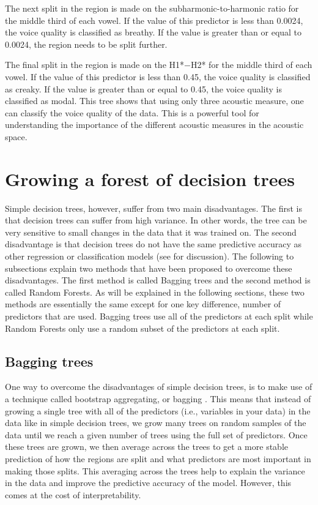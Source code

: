 The next split in the region is made on the subharmonic-to-harmonic ratio for the middle third of each vowel. If the value of this predictor is less than 0.0024, the voice quality is classified as breathy. If the value is greater than or equal to 0.0024, the region needs to be split further.

The final split in the region is made on the H1*$-$H2* for the middle third of each vowel. If the value of this predictor is less than 0.45, the voice quality is classified as creaky. If the value is greater than or equal to 0.45, the voice quality is classified as modal. This tree shows that using only three acoustic measure, one can classify the voice quality of the data. This is a powerful tool for understanding the importance of the different acoustic measures in the acoustic space. 

\section{Growing a forest of decision trees} \label{sec:growing_forest}

Simple decision trees, however, suffer from two main disadvantages. The first is that decision trees can suffer from high variance. In other words, the tree can be very sensitive to small changes in the data that it was trained on. The second disadvantage is that decision trees do not have the same predictive accuracy as other regression or classification models (see \cite{hastieElementsStatisticalLearning2009} for discussion). The following to subsections explain two methods that have been proposed to overcome these disadvantages. The first method is called Bagging trees and the second method is called Random Forests. As will be explained in the following sections, these two methods are essentially the same except for one key difference, number of predictors that are used. Bagging trees use all of the predictors at each split while Random Forests only use a random subset of the predictors at each split. 

\subsection{Bagging trees} \label{sec:bagging_bagging}
One way to overcome the disadvantages of simple decision trees, is to make use of a technique called bootstrap aggregating, or bagging \citep{breimanBaggingPredictors1996}. This means that instead of growing a single tree with all of the predictors (i.e., variables in your data) in the data like in simple decision trees, we grow many trees on random samples of the data until we reach a given number of trees using the full set of predictors. Once these trees are grown, we then average across the trees to get a more stable prediction of how the regions are split and what predictors are most important in making those splits. This averaging across the trees help to explain the variance in the data and improve the predictive accuracy of the model. However, this comes at the cost of interpretability. 

